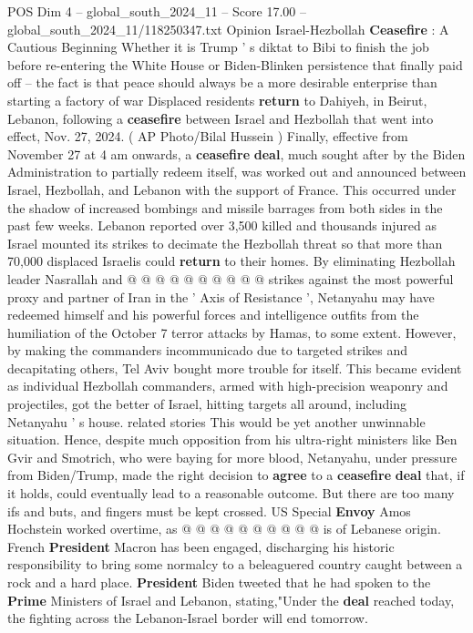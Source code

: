 \begin{textsample}{POS Dim 4 – global\_south\_2024\_11 – Score 17.00 – global\_south\_2024\_11/118250347.txt}  \label{ex:f4_pos_285}
Opinion Israel-Hezbollah \textbf{Ceasefire} : A Cautious Beginning Whether it is Trump ' s diktat to Bibi to finish the job before re-entering the White House or Biden-Blinken persistence that finally paid off -- the fact is that peace should always be a more desirable enterprise than starting a factory of war Displaced residents \textbf{return} to Dahiyeh, in Beirut, Lebanon, following a \textbf{ceasefire} between Israel and Hezbollah that went into effect, Nov. 27, 2024. ( AP Photo/Bilal Hussein ) Finally, effective from November 27 at 4 am onwards, a \textbf{ceasefire} \textbf{deal}, much sought after by the Biden Administration to partially redeem itself, was worked out and announced between Israel, Hezbollah, and Lebanon with the support of France.
This occurred under the shadow of increased bombings and missile barrages from both sides in the past few weeks.
Lebanon reported over 3,500 killed and thousands injured as Israel mounted its strikes to decimate the Hezbollah threat so that more than 70,000 displaced Israelis could \textbf{return} to their homes.
By eliminating Hezbollah leader Nasrallah and @ @ @ @ @ @ @ @ @ @ strikes against the most powerful proxy and partner of Iran in the ' Axis of Resistance ', Netanyahu may have redeemed himself and his powerful forces and intelligence outfits from the humiliation of the October 7 terror attacks by Hamas, to some extent.
However, by making the commanders incommunicado due to targeted strikes and decapitating others, Tel Aviv bought more trouble for itself.
This became evident as individual Hezbollah commanders, armed with high-precision weaponry and projectiles, got the better of Israel, hitting targets all around, including Netanyahu ' s house. related stories This would be yet another unwinnable situation.
Hence, despite much opposition from his ultra-right ministers like Ben Gvir and Smotrich, who were baying for more blood, Netanyahu, under pressure from Biden/Trump, made the right decision to \textbf{agree} to a \textbf{ceasefire} \textbf{deal} that, if it holds, could eventually lead to a reasonable outcome.
But there are too many ifs and buts, and fingers must be kept crossed.
US Special \textbf{Envoy} Amos Hochstein worked overtime, as @ @ @ @ @ @ @ @ @ @ is of Lebanese origin.
French \textbf{President} Macron has been engaged, discharging his historic responsibility to bring some normalcy to a beleaguered country caught between a rock and a hard place. \textbf{President} Biden tweeted that he had spoken to the \textbf{Prime} Ministers of Israel and Lebanon, stating,"Under the \textbf{deal} reached today, the fighting across the Lebanon-Israel border will end tomorrow.

\end{textsample}
